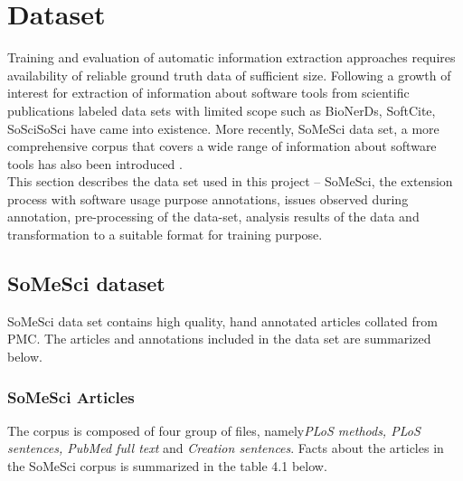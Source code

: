 \chapter{Dataset}
\label{ch:dataset}
 
%
%

Training and evaluation of automatic information extraction approaches requires availability of reliable ground truth data of sufficient size. Following a growth of interest for extraction of information about software tools from scientific publications labeled data sets with limited scope such as BioNerDs, SoftCite, SoSciSoSci have came into existence. More recently, \ac{SoMeSci} data set, a more comprehensive corpus that covers a wide range of information about software tools has also been introduced \citep{schindler2021somesci}.  \\

This section describes the data set used in this project – \ac{SoMeSci},  the extension process with software usage purpose annotations, issues observed during annotation, pre-processing of the data-set, analysis results of the data and transformation to a suitable format for training purpose.  


\section{SoMeSci dataset}
\label{sec:dataset:SoMeSci}

\ac{SoMeSci} data set contains high quality, hand annotated articles collated from  \ac{PMC}. The articles and annotations included in the data set are summarized below.  

\subsection{ SoMeSci Articles }
\label{subsec:dataset:SoMeSci:Articles}

The corpus is composed of four group of files, namely\emph{PLoS methods, PLoS sentences, PubMed full text} and \emph{Creation sentences}. Facts about the articles in the \ac{SoMeSci} corpus is summarized in the table 4.1 below.

